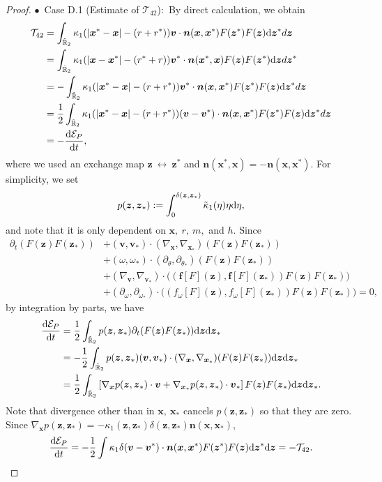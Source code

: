 \documentclass[a4paper,11pt]{article}
\numberwithin{equation}{section}
\theoremstyle{definition}
\newcommand{\bfx}{\boldsymbol{x}}
\newcommand{\bfz}{\boldsymbol{z}}
\newcommand{\bfv}{\boldsymbol{v}}
\newcommand{\bfn}{\boldsymbol{n}}
\newcommand{\bff}{\boldsymbol{f}}
\newcommand{\bbr}{\mathbb R}
\def\d{{  \rm d}}
\newcommand{\T}{\mathcal{T}}
\newcommand{\E}{\mathcal{E}}
\begin{document}
\begin{proof}
\noindent $\bullet$~Case D.1 (Estimate of $\T_{42}$):~By direct calculation, we obtain
\begin{align}
\begin{aligned} \label{eq:T42}
\T_{42} & = \int_{\hat{\bbr}_2}   \kappa_1 (|\bfx^* - \bfx| - (r + r^*)) \bfv \cdot \bfn(\bfx, \bfx^*)  F( \bfz^*) F(\bfz)\d\bfz^* d \bfz   \\
& = \int_{\hat{\bbr}_2}   \kappa_1  (|\bfx - \bfx^*| - (r^* + r)) \bfv^* \cdot \bfn(\bfx^*, \bfx)  F( \bfz) F(\bfz^*)\d\bfz d \bfz^*   \\
&=  -\int_{\hat{\bbr}_2}   \kappa_1  (|\bfx^* - \bfx| - (r + r^*)) \bfv^* \cdot \bfn(\bfx, \bfx^*)  F( \bfz^*) F(\bfz)\d\bfz^* d \bfz   \\
&= \frac{1}{2} \int_{\hat{\bbr}_2}   \kappa_1  (|\bfx^* - \bfx| - (r + r^*))( \bfv - \bfv^*)  \cdot \bfn(\bfx, \bfx^*)  F( \bfz^*) F(\bfz)\d\bfz^* d \bfz \\
&= -\frac{\d \E_P}{\d t},
\end{aligned}
\end{align}
where we used an exchange map $\bfz~\longleftrightarrow~\bfz^*$ and $\bfn(\bfx^*, \bfx) = -\bfn(\bfx, \bfx^*)$. 
For simplicity, we set 
\[
p(\bfz,\bfz_*):=\int_0^{\delta(\bfz,\bfz_*)} \tilde{\kappa}_1(\eta)\eta \d \eta,
\]
and note that it is only dependent on $\bfx,\ r,\ m,$ and $h$.
Since
\begin{align*}
\partial_t(F(\bfz)F(\bfz_*))
&+   (\bfv,\bfv_*)  \cdot (\nabla_{\bfx},\nabla_{\bfx_*}) (F(\bfz)F(\bfz_*))\\
&+ (\omega,\omega_*)\cdot (\partial_\theta, \partial_{\theta_*}) (F(\bfz)F(\bfz_*))\\
&+  (\nabla_{\bfv},\nabla_{\bfv_*}) \cdot \big((\bff[F](\bfz),\bff[F](\bfz_*)) F(\bfz)F(\bfz_*)\big)\\
&+  (\partial_{\omega}, \partial_{\omega_*}) \cdot\big((f_{\omega}[F](\bfz),f_{\omega}[F](\bfz_*)) F(\bfz)F(\bfz_*)\big)= 0,
\end{align*}
by integration by parts, we have
\begin{align*}
\frac{\d \E_P}{\d t}
&= \frac{1}{2}\int_{\hat{\bbr}_2} p(\bfz,\bfz_*)\partial_t(F(\bfz)F(\bfz_*)) \d \bfz\d\bfz_*\\
&= -\frac{1}{2}\int_{\hat{\bbr}_2} p(\bfz,\bfz_*) (\bfv,\bfv_*)  \cdot (\nabla_{\bfx},\nabla_{\bfx_*}) (F(\bfz)F(\bfz_*)) \d \bfz\d\bfz_*\\
&= \frac{1}{2}\int_{\hat{\bbr}_2} \left[\nabla_{\bfx}p(\bfz,\bfz_*)\cdot\bfv+\nabla_{\bfx_*}p(\bfz,\bfz_*)\cdot\bfv_*\right] F(\bfz)F(\bfz_*) \d \bfz\d\bfz_*.
\end{align*}
Note that divergence other than in $\bfx,\ \bfx_*$ cancels $p(\bfz,\bfz_*)$ so that they are zero.
Since $\nabla_{\bfx}p(\bfz,\bfz_*) = -\kappa_1(\bfz,\bfz_*)\delta(\bfz,\bfz_*)\bfn(\bfx,\bfx_*)$, 
\[
\frac{\d \E_P}{\d t}=-\frac{1}{2}\int \kappa_1\delta ( \bfv - \bfv^*)  \cdot \bfn(\bfx, \bfx^*)  F( \bfz^*) F(\bfz) \d\bfz^* \d \bfz=-\mathcal{T}_{42}.
\]
%



\end{proof}
\end{document}
